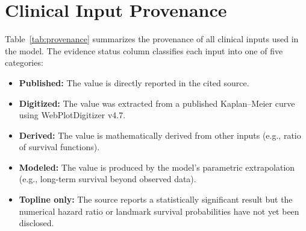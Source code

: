 \section{Clinical Input Provenance}
\label{sec:provenance}

Table~\ref{tab:provenance} summarizes the provenance of all clinical inputs used in the model. The evidence status column classifies each input into one of five categories:

\begin{itemize}
    \item \textbf{Published:} The value is directly reported in the cited source.
    \item \textbf{Digitized:} The value was extracted from a published Kaplan--Meier curve using WebPlotDigitizer v4.7.
    \item \textbf{Derived:} The value is mathematically derived from other inputs (e.g., ratio of survival functions).
    \item \textbf{Modeled:} The value is produced by the model's parametric extrapolation (e.g., long-term survival beyond observed data).
    \item \textbf{Topline only:} The source reports a statistically significant result but the numerical hazard ratio or landmark survival probabilities have not yet been disclosed.
\end{itemize}

